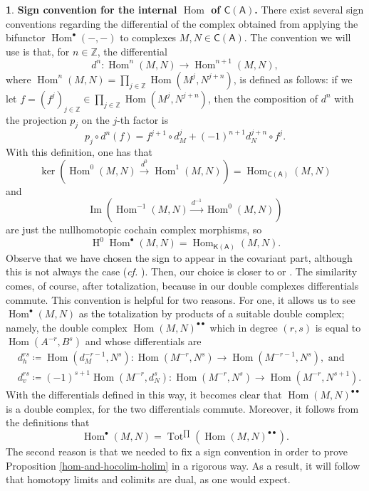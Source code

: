 \documentclass[reqno,11pt]{amsart}
\theoremstyle{plain}
\theoremstyle{remark}
\theoremstyle{definition}
\newtheorem{cosa}[thm]{}
\numberwithin{equation}{thm}
\newcommand{\SA}{\mathsf{A}}
\newcommand{\CCC}{\boldsymbol{\mathsf{C}}}
\newcommand{\K}{\boldsymbol{\mathsf{K}}}
\newcommand{\ZZ}{\mathbb{Z}}
\newcommand{\lto}{\longrightarrow}
\DeclareMathOperator{\Hom}{Hom}
\DeclareMathOperator{\Tot}{Tot}
\DeclareMathOperator{\Img}{Im}
\DeclareMathOperator{\h}{H}
\begin{document}
	\begin{cosa}\label{convention-internal-hom}
		\textbf{Sign convention for the internal $\Hom$ of $\CCC(\SA)$.}
		There exist several sign conventions regarding the differential of the complex obtained from applying the bifunctor $\Hom^\bullet(-,-)$ to complexes $M,N \in \CCC(\SA)$. The convention we will use is that, for $n \in \ZZ$, the differential
		\[
			d^n \colon \Hom^n(M,N)  \lto  \Hom^{n+1}(M,N),
		\]
		where $\Hom^n(M,N) = \prod_{j \in \ZZ} \Hom(M^j,N^{j+n})$, is defined as follows: if we let $f = (f^j)_{j \in \ZZ} \in \prod_{j \in \ZZ} \Hom(M^j,N^{j+n})$, then the composition of $d^n$ with the projection $p_j$ on the $j$-th factor is
		\[
			p_j \circ d^n(f) = f^{j+1} \circ d_M^j+ (-1)^{n+1} d_N^{j+n} \circ f^j.
		\]
		With this definition, one has that 
		\[
			\ker(\Hom^0(M,N) \overset{d^0}{\lto} \Hom^1(M,N)) = \Hom_{\CCC(\SA)}(M,N)	
		\]
		and 
		\[
			\Img(\Hom^{-1}(M,N) \overset{d^{-1}}{\lto} \Hom^0(M,N))
		\] 
		are just the nullhomotopic cochain complex morphisms, so 
		\[
			\h^0 \Hom^\bullet(M,N) = \Hom_{\K(\SA)}(M,N).
		\]
		Observe that we have chosen the sign to appear in the covariant part, although this is not always the case (\textit{cf.} \cite[p. 23]{yellow}). Then, our choice is closer to \cite[p. 62]{W} or \cite[p. 168]{HS}. The similarity comes, of course, after totalization, because in our double complexes differentials commute. This convention is helpful for two reasons. For one, it allows us to see $\Hom^\bullet(M,N)$ as the totalization by products of a suitable double complex; namely, the double complex $\Hom(M,N)^{\bullet\bullet}$ which in degree $(r,s)$ is equal to $\Hom(A^{-r},B^s)$ and whose differentials are
		\begin{equation*}
			\begin{aligned}
				&d_h^{rs} \coloneqq \Hom(d_M^{-r-1},N^s) \colon \Hom(M^{-r},N^s) \lto \Hom(M^{-r-1}, N^s), \text{ and} \\
				&d_v^{rs} \coloneqq (-1)^{s+1}\Hom(M^{-r},d_N^s) \colon \Hom(M^{-r},N^s) \lto \Hom(M^{-r}, N^{s+1}).
			\end{aligned}
		\end{equation*}
		With the differentials defined in this way, it becomes clear that $\Hom(M,N)^{\bullet\bullet}$ is a double complex, for the two differentials commute. Moreover, it follows from the definitions that
		\[ \Hom^\bullet(M,N) = \Tot^{\prod}(\Hom(M,N)^{\bullet\bullet}). \]
		The second reason is that we needed to fix a sign convention in order to prove Proposition \ref{hom-and-hocolim-holim} in a rigorous way. As a result, it will follow that homotopy limits and colimits are dual, as one would expect.
	\end{cosa}
	
\end{document}
